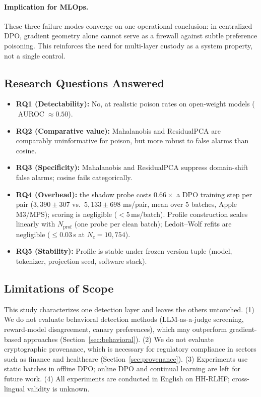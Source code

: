 \documentclass[runningheads]{llncs}
\DeclareMathOperator{\AUROC}{AUROC}
\begin{document}
\paragraph{Implication for MLOps.}
These three failure modes converge on one operational conclusion: in centralized
DPO, gradient geometry alone cannot serve as a firewall against subtle preference
poisoning. This reinforces the need for multi-layer custody as a system property,
not a single control.

\subsection{Research Questions Answered}

\begin{itemize}[leftmargin=*,noitemsep]
  \item \textbf{RQ1 (Detectability):} No, at realistic poison rates on
    open-weight models ($\AUROC \approx 0.50$).
  \item \textbf{RQ2 (Comparative value):} Mahalanobis and ResidualPCA are
    comparably uninformative for poison, but more robust to false alarms than
    cosine.
  \item \textbf{RQ3 (Specificity):} Mahalanobis and ResidualPCA suppress
    domain-shift false alarms; cosine fails categorically.
  \item \textbf{RQ4 (Overhead):} the shadow probe costs $0.66\times$ a DPO
    training step per pair ($3{,}390 \pm 307$ vs.\ $5{,}133 \pm 698$ ms/pair,
    mean over 5 batches, Apple M3/MPS); scoring is negligible
    ($< 5$\,ms/batch). Profile construction scales linearly with
    $N_{\text{prof}}$ (one probe per clean batch); Ledoit--Wolf refits are
    negligible ($\leq 0.03$\,s at $N_c = 10{,}754$).
  \item \textbf{RQ5 (Stability):} Profile is stable under frozen version tuple
    (model, tokenizer, projection seed, software stack).
\end{itemize}

\subsection{Limitations of Scope}\label{sec:limitations}

This study characterizes one detection layer and leaves the others untouched.
(1) We do not evaluate behavioral detection methods (LLM-as-a-judge screening,
reward-model disagreement, canary preferences), which may outperform
gradient-based approaches (Section~\ref{sec:behavioral}). (2) We do not
evaluate cryptographic provenance, which is necessary for regulatory
compliance in sectors such as finance and healthcare
(Section~\ref{sec:provenance}). (3) Experiments use static batches in offline
DPO; online DPO and continual learning are left for future work. (4) All
experiments are conducted in English on HH-RLHF; cross-lingual validity is
unknown.
\end{document}
